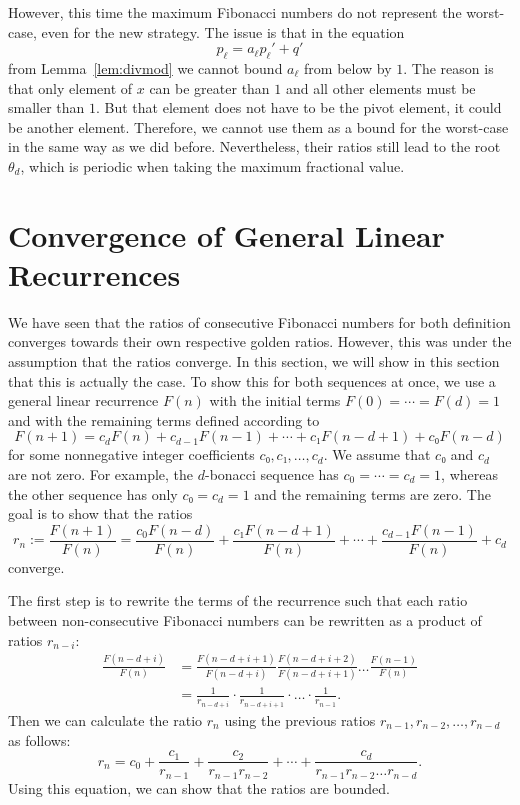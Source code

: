 However, this time the maximum Fibonacci numbers do not represent the worst-case,
even for the new strategy.
The issue is that in the equation
\[
  p_ℓ = a_ℓ p_ℓ' + q'
\]
from Lemma~\ref{lem:divmod} we cannot bound $a_ℓ$ from below by $1$.
The reason is that only element of $x$ can be greater than $1$
and all other elements must be smaller than $1$.
But that element does not have to be the pivot element,
it could be another element.
Therefore, we cannot use them as a bound for the worst-case
in the same way as we did before.
Nevertheless, their ratios still lead to the root $θ_d$,
which is periodic when taking the maximum fractional value.

\section{Convergence of General Linear Recurrences}
\label{sec:fib-conv}


We have seen that the ratios of consecutive Fibonacci numbers for both
definition converges towards their own respective golden ratios.
However, this was under the assumption that the ratios converge.
In this section, we will show in this section that this is actually the case.
To show this for both sequences at once, we use a general linear recurrence $F(n)$
with the initial terms $F(0) = ⋯ = F(d) = 1$ and with the remaining terms
defined according to
\[
  F(n + 1) = c_d F(n) + c_{d-1} F(n-1) + ⋯ + c₁ F(n - d + 1) + c₀ F(n - d)
\]
for some nonnegative integer coefficients $c₀, c₁, …, c_d$.
We assume that $c₀$ and $c_d$ are not zero.
For example, the $d$-bonacci sequence has $c_0 = ⋯ = c_d = 1$,
whereas the other sequence has only $c₀ = c_d = 1$ and the remaining terms are zero.
The goal is to show that the ratios
\[
  r_n
  := \frac{F(n+1)}{F(n)}
  = \frac{c_0 F(n - d)}{F(n)} + \frac{c₁ F(n - d + 1)}{F(n)} + ⋯ + \frac{c_{d-1} F(n-1)}{F(n)} + c_d
\]
converge.

The first step is to rewrite the terms of the recurrence such that each ratio
between non-consecutive Fibonacci numbers can be rewritten as a product of
ratios $r_{n-i}$:
\begin{align*}
  \frac{F(n - d + i)}{F(n)}
  & = \frac{F(n - d + i + 1)}{F(n - d + i)} \frac{F(n - d + i + 2)}{F(n - d + i + 1)} \dots \frac{F(n-1)}{F(n)} \\
  & = \frac{1}{r_{n - d + i}} · \frac{1}{r_{n - d + i + 1}} · \dots · \frac{1}{r_{n-1}}.
\end{align*}
Then we can calculate the ratio $r_n$ using the previous ratios $r_{n-1}, r_{n-2}, …, r_{n-d}$ as follows:
\[
  r_n = c_0 + \frac{c_1}{r_{n-1}} + \frac{c_2}{r_{n-1} r_{n-2}} + ⋯ + \frac{c_d}{r_{n-1} r_{n-2} \dots r_{n-d}}.
\]
Using this equation, we can show that the ratios are bounded.

